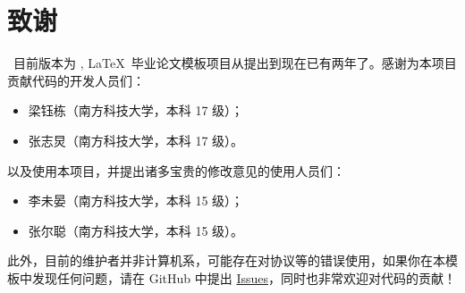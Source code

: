 \section*{致谢}
\sustechthesis\ 目前版本为 \version, \LaTeX\ 毕业论文模板项目从提出到现在已有两年了。感谢为本项目贡献代码的开发人员们：
\begin{itemize}
    \item 梁钰栋（南方科技大学，本科 17 级）；
    \item 张志炅（南方科技大学，本科 17 级）。
\end{itemize}
以及使用本项目，并提出诸多宝贵的修改意见的使用人员们：
\begin{itemize}
    \item 李未晏（南方科技大学，本科 15 级）；
    \item 张尔聪（南方科技大学，本科 15 级）。
\end{itemize}

此外，目前的维护者并非计算机系，可能存在对协议等的错误使用，如果你在本模板中发现任何问题，请在 GitHub 中提出 \href{https://github.com/Iydon/sustechthesis/issues}{Issues}，同时也非常欢迎对代码的贡献！
